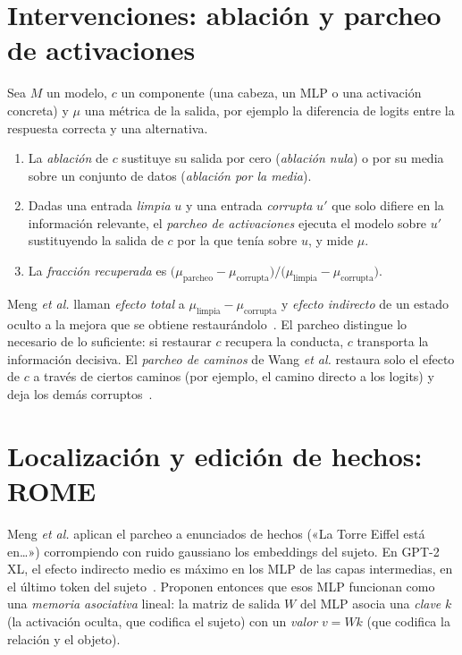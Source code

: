 \section{Intervenciones: ablación y parcheo de activaciones}

\begin{definicion}\label{def:parcheo}
Sea $M$ un modelo, $c$ un componente (una cabeza, un MLP o una activación concreta) y $\mu$ una métrica de la salida, por ejemplo la diferencia de logits entre la respuesta correcta y una alternativa.
\begin{enumerate}
  \item La \emph{ablación} de $c$ sustituye su salida por cero (\emph{ablación nula}) o por su media sobre un conjunto de datos (\emph{ablación por la media}).
  \item Dadas una entrada \emph{limpia} $u$ y una entrada \emph{corrupta} $u'$ que solo difiere en la información relevante, el \emph{parcheo de activaciones} ejecuta el modelo sobre $u'$ sustituyendo la salida de $c$ por la que tenía sobre $u$, y mide $\mu$.
  \item La \emph{fracción recuperada} es $\bigl(\mu_{\mathrm{parcheo}}-\mu_{\mathrm{corrupta}}\bigr)/\bigl(\mu_{\mathrm{limpia}}-\mu_{\mathrm{corrupta}}\bigr)$.
\end{enumerate}
\end{definicion}

Meng \emph{et al.} llaman \emph{efecto total} a $\mu_{\mathrm{limpia}}-\mu_{\mathrm{corrupta}}$ y \emph{efecto indirecto} de un estado oculto a la mejora que se obtiene restaurándolo~\cite[§2.1]{meng}. El parcheo distingue lo necesario de lo suficiente: si restaurar $c$ recupera la conducta, $c$ transporta la información decisiva. El \emph{parcheo de caminos} de Wang \emph{et al.} restaura solo el efecto de $c$ a través de ciertos caminos (por ejemplo, el camino directo a los logits) y deja los demás corruptos~\cite[§3.1]{wang-ioi}.

\addtocounter{definicion}{1}%

\section{Localización y edición de hechos: ROME}

Meng \emph{et al.} aplican el parcheo a enunciados de hechos («La Torre Eiffel está en…») corrompiendo con ruido gaussiano los embeddings del sujeto. En GPT-2 XL, el efecto indirecto medio es máximo en los MLP de las capas intermedias, en el último token del sujeto~\cite[§2.2]{meng}. Proponen entonces que esos MLP funcionan como una \emph{memoria asociativa} lineal: la matriz de salida $W$ del MLP asocia una \emph{clave} $k$ (la activación oculta, que codifica el sujeto) con un \emph{valor} $v=Wk$ (que codifica la relación y el objeto).

